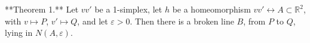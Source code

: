 **Theorem 1.** Let $vv'$ be a 1-simplex, let $h$ be a homeomorphism $vv' \leftrightarrow A \subset \mathbb{R}^2$, with $v \mapsto P$, $v' \mapsto Q$, and let $\varepsilon > 0$. Then there is a broken line $B$, from $P$ to $Q$, lying in $N(A, \varepsilon)$.
